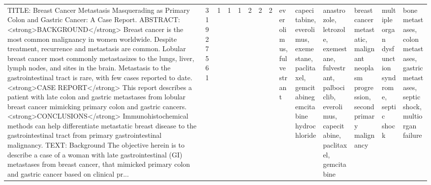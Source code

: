 \begin{longtable}{llllllllllllll}
TITLE: Breast Cancer Metastasis Masquerading as Primary Colon and Gastric Cancer: A Case Report. ABSTRACT: <strong>BACKGROUND</strong> Breast cancer is the most common malignancy in women worldwide. Despite treatment, recurrence and metastasis are common. Lobular breast cancer most commonly metastasizes to the lungs, liver, lymph nodes, and sites in the brain. Metastasis to the gastrointestinal tract is rare, with few cases reported to date. <strong>CASE REPORT</strong> This report describes a patient with late colon and gastric metastases from lobular breast cancer mimicking primary colon and gastric cancers. <strong>CONCLUSIONS</strong> Immunohistochemical methods can help differentiate metastatic breast disease to the gastrointestinal tract from primary gastrointestinal malignancy. TEXT: Background The objective herein is to describe a case of a woman with late gastrointestinal (GI) metastases from breast cancer, that mimicked primary colon and gastric cancer based on clinical pr... & 31927561 &              1 &                     1 &             1 &                 2 &                        2 &                2 &                                                                                                                                                                                                                                         everolimus, fulvestrant &                            capecitabine, everolimus, exemestane, paclitaxel, gemcitabinegemcitabine hydrochloride &                                                                                                        anastrozole, letrozole, exemestane, fulvestrant, palbociclib, everolimus, capecitabine, paclitaxel, gemcitabine &                                                                              breast cancer metastatic, malignant neoplasm progression, second primary malignancy &                                                                                                                                                                                                                 multiple organ dysfunction syndrome, septic shock &                       bone metastases, colon metastases, gastric metastases, septic shock, multiorgan failure \\

\end{longtable}
